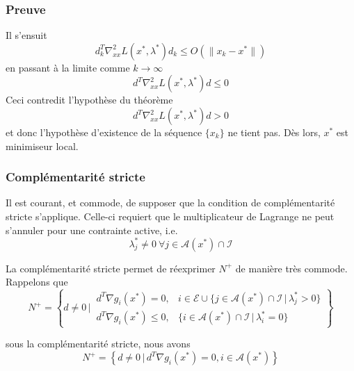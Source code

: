 \documentclass[usepdftitle=false]{beamer}
\def\cA{\mathcal{A}}
\def\cB{\mathcal{B}}
\def\cE{\mathcal{E}}
\def\cI{\mathcal{I}}
\begin{document}
\begin{frame}
\frametitle{Preuve}

Il s'ensuit
$$
d_k^T \nabla^2_{xx} L(x^*,\lambda^*) d_k \leq O( \| x_k - x^* \| )
$$
en passant à la limite comme $k \rightarrow \infty$
$$
d^T \nabla^2_{xx} L(x^*,\lambda^*) d \leq 0
$$
Ceci contredit l'hypothèse du théorème
$$
d^T \nabla^2_{xx} L(x^*,\lambda^*) d > 0
$$
et donc l'hypothèse d'existence de la séquence $\{ x_k \}$ ne tient pas. Dès lors, $x^*$ est minimiseur local.

\end{frame}






\begin{frame}
\frametitle{Complémentarité stricte}

Il est courant, et commode, de supposer que la condition de complémentarité stricte s'applique. Celle-ci requiert que le multiplicateur de Lagrange ne peut s'annuler pour une contrainte active, i.e.
$$
\lambda_j^* \ne 0\ \forall j \in \cA(x^*) \cap \cI
$$

\mbox{}

La complémentarité stricte permet de réexprimer $N^+$ de manière très commode. Rappelons que
$$
N^+ =
\left\lbrace d \ne 0 \,\bigg|\,
\begin{matrix}
d^T \nabla g_i(x^*) = 0, & i \in \cE \cup \{ j \in \cA(x^*) \cap \cI \,|\, \lambda_j^* > 0 \} \\
d^T \nabla g_i(x^*) \leq 0, & \{ i \in \cA(x^*) \cap \cI \,|\, \lambda_i^* = 0 \} 
\end{matrix}
\right\rbrace
$$


sous la complémentarité stricte, nous avons
$$
N^+ =
\left\lbrace d \ne 0 \,|\,
d^T \nabla g_i(x^*) = 0, i \in \cA(x^*)
\right\rbrace
$$

\end{frame}
\end{document}
